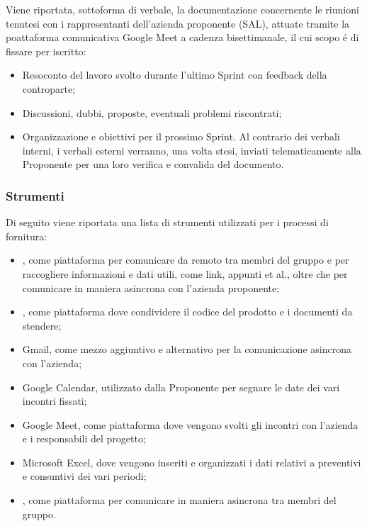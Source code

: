 Viene riportata, sottoforma di verbale, la documentazione concernente le riunioni tenutesi con i rappresentanti dell'azienda proponente (SAL), attuate tramite la poattaforma comunicativa Google Meet a cadenza bisettimanale, il cui scopo é di fissare per iscritto:
\begin{itemize}
    \item Resoconto del lavoro svolto durante l'ultimo Sprint con feedback della controparte;
    \item Discussioni, dubbi, proposte, eventuali problemi riscontrati;
    \item Organizzazione e obiettivi per il prossimo Sprint.
Al contrario dei verbali interni, i verbali esterni verranno, una volta stesi, inviati telematicamente alla Proponente per una loro verifica e convalida del documento.
\end{itemize} 
\subsubsection{Strumenti}
Di seguito viene riportata una lista di strumenti utilizzati per i processi di fornitura:
\begin{itemize}
    \item {}, come piattaforma per comunicare da remoto tra membri del gruppo e per raccogliere informazioni e dati utili, come link, appunti et al., oltre che per comunicare in maniera asincrona con l'azienda proponente;
    \item {}, come piattaforma dove condividere il codice del prodotto e i documenti da stendere;
    \item Gmail, come mezzo aggiuntivo e alternativo per la comunicazione asincrona con l'azienda;
    \item Google Calendar, utilizzato dalla Proponente per segnare le date dei vari incontri fissati;
    \item Google Meet, come piattaforma dove vengono svolti gli incontri con l'azienda e i responsabili del progetto; 
    \item Microsoft Excel, dove vengono inseriti e organizzati i dati relativi a preventivi e consuntivi dei vari periodi; 
    \item {}, come piattaforma per comunicare in maniera asincrona tra membri del gruppo. 
\end{itemize}